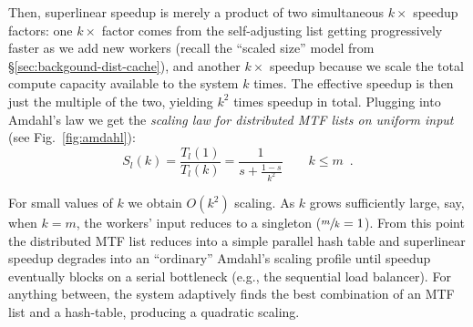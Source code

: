 Then, superlinear speedup is merely a product of two simultaneous $k\times$ speedup factors: one $k\times$ factor comes from the self-adjusting list getting progressively faster as we add new workers (recall the ``scaled size'' model from \S\ref{sec:backgound-dist-cache}), and another $k\times$ speedup because we scale the total compute capacity available to the system $k$ times. The effective speedup is then just the multiple of the two, yielding $k^2$ times speedup in total. Plugging into Amdahl's law we get the \emph{scaling law for distributed MTF lists on uniform input} (see Fig.~\ref{fig:amdahl}):
\begin{equation}\label{eq:mtf-perf}
  S_l(k) = \frac{T_l(1)}{T_l(k)} = \frac1{s + \frac{1-s}{k^2}} \qquad k \le m \enspace .
\end{equation}

For small values of $k$ we obtain $O(k^2)$ scaling. As $k$ grows sufficiently large, say, when $k=m$, the workers' input reduces to a singleton ($\sfrac{m}{k}=1$). From this point the distributed MTF list reduces into a simple parallel hash table and superlinear speedup degrades into an ``ordinary'' Amdahl's scaling profile until speedup eventually blocks on a serial bottleneck (e.g., the sequential load balancer).  For anything between, the system adaptively finds the best combination of an MTF list and a hash-table, producing a quadratic scaling.

